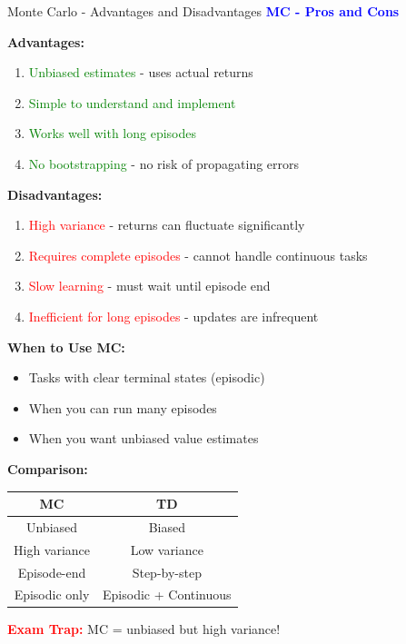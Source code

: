 \documentclass[8pt]{beamer}
\begin{document}
\begin{frame}{Monte Carlo - Advantages and Disadvantages}
\fontsize{6.5}{7.5}\selectfont
\textcolor{blue}{\textbf{MC - Pros and Cons}}

\textbf{Advantages:}
\begin{enumerate}
\item \textcolor{green}{Unbiased estimates} - uses actual returns
\item \textcolor{green}{Simple to understand and implement}
\item \textcolor{green}{Works well with long episodes}
\item \textcolor{green}{No bootstrapping} - no risk of propagating errors
\end{enumerate}

\textbf{Disadvantages:}
\begin{enumerate}
\item \textcolor{red}{High variance} - returns can fluctuate significantly
\item \textcolor{red}{Requires complete episodes} - cannot handle continuous tasks
\item \textcolor{red}{Slow learning} - must wait until episode end
\item \textcolor{red}{Inefficient for long episodes} - updates are infrequent
\end{enumerate}

\textbf{When to Use MC:}
\begin{itemize}
\item Tasks with clear terminal states (episodic)
\item When you can run many episodes
\item When you want unbiased value estimates
\end{itemize}

\textbf{Comparison:}
\begin{tabular}{|c|c|}
\hline
MC & TD \\
\hline
Unbiased & Biased \\
\hline
High variance & Low variance \\
\hline
Episode-end & Step-by-step \\
\hline
Episodic only & Episodic + Continuous \\
\hline
\end{tabular}

\textcolor{red}{\textbf{Exam Trap:}} MC = unbiased but high variance!
\end{frame}
\end{document}
